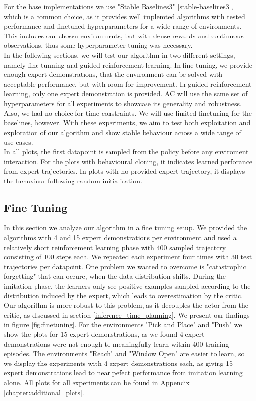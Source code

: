 For the base implementations we use "Stable Baselines3" \ref{stable-baselines3}, which is a common choice, as it provides well implemted algorithms with tested 
performance and finetuned hyperparameters for a wide range of environments. This includes our chosen environments, but with dense rewards and continuous observations, 
thus some hyperparameter tuning was necessary. \\

In the following sections, we will test our algorithm in two different settings, namely fine tunning and guided reinforcement learning. In fine tuning, we provide 
enough expert demonstrations, that the environment can be solved with acceptable performance, but with room for improvement. In guided reinforcement learning, 
only one expert demonstration is provided. AC will use the same set of hyperparameters for all experiments to showcase its generality and robustness. Also, we had no choice for time constraints. 
We will use limited finetuning for the baselines, however. 
With these experiments, we aim to test both exploitation and exploration of our algorithm and show stable 
behaviour across a wide range of use cases. \\

In all plots, the first datapoint is sampled from the policy before any enviroment interaction. For the plots with behavioural cloning, it indicates learned perforance from expert trajectories. 
In plots with no provided expert trajectory, it displays the behaviour following random initialisation.


\subsection{Fine Tuning}
\label{sec:fine_tuning}
In this section we analyze our algorithm in a fine tuning setup. We provided the algorithms with 4 and 15 expert demonstrations per environment and used a relatively short reinforcement learning phase 
with 400 sampled trajectory consisting of 100 steps each. We repeated each experiment four times with 30 test trajectories per datapoint. One problem we wanted to overcome is "catastrophic 
forgetting" that can occure, when the data distribution shifts. During the imitation phase, the learners only see positive examples sampled according to the distribution induced by the expert, which leads 
to overestimation by the critic. Our algorithm is more robust to this problem, as it 
decouples the actor from the critic, as discussed in section \ref{inference_time_planning}. We present our findings in 
figure \ref{fig:finetuning}. For the environments "Pick and Place" and "Push" we show the plots 
for 15 expert demonstrations, as we found 4 expert demonstrations were not enough to meaningfully learn within 400 training episodes. The environments "Reach" and "Window Open" are easier to learn, 
so we display the experiments with 4 expert demonstrations each, as giving 15 expert demonstrations lead to near pefect performance from imitation learning alone. All plots for all experiments can 
be found in Appendix \ref{chapter:additional_plots}. 

